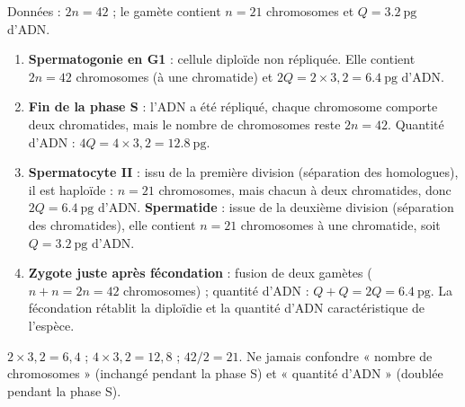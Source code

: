 \documentclass[11pt]{article}
\begin{document}
\begin{corrige}
Données : $2n = 42$ ; le gamète contient $n = 21$ chromosomes et $Q = \SI{3,2}{\pico\gram}$ d'ADN.
\begin{enumerate}
\item \textbf{Spermatogonie en G1} : cellule diploïde non répliquée. Elle contient $2n = 42$ chromosomes (à une chromatide) et $2Q = 2 \times 3,2 = \SI{6,4}{\pico\gram}$ d'ADN.
\item \textbf{Fin de la phase S} : l'ADN a été répliqué, chaque chromosome comporte deux chromatides, mais le nombre de chromosomes reste $2n = 42$. Quantité d'ADN : $4Q = 4 \times 3,2 = \SI{12,8}{\pico\gram}$.
\item \textbf{Spermatocyte II} : issu de la première division (séparation des homologues), il est haploïde : $n = 21$ chromosomes, mais chacun à deux chromatides, donc $2Q = \SI{6,4}{\pico\gram}$ d'ADN. \textbf{Spermatide} : issue de la deuxième division (séparation des chromatides), elle contient $n = 21$ chromosomes à une chromatide, soit $Q = \SI{3,2}{\pico\gram}$ d'ADN.
\item \textbf{Zygote juste après fécondation} : fusion de deux gamètes ($n + n = 2n = 42$ chromosomes) ; quantité d'ADN : $Q + Q = 2Q = \SI{6,4}{\pico\gram}$. La fécondation rétablit la diploïdie et la quantité d'ADN caractéristique de l'espèce.
\end{enumerate}
\end{corrige}

\begin{attention}
$2 \times 3,2 = 6,4$ ; $4 \times 3,2 = 12,8$ ; $42/2 = 21$. Ne jamais confondre « nombre de chromosomes » (inchangé pendant la phase S) et « quantité d'ADN » (doublée pendant la phase S).
\end{attention}
\end{document}
